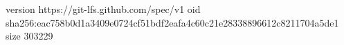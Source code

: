 version https://git-lfs.github.com/spec/v1
oid sha256:eac758b0d1a3409e0724cf51bdf2eafa4c60c21e28338896612c8211704a5de1
size 303229
